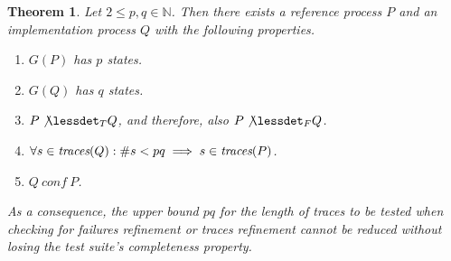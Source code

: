 \documentclass[3p,times]{elsarticle}
\newcommand{\trc}{\text{\it traces}}
\newtheorem{theorem}{Theorem}
\begin{document}
\begin{theorem}\label{th:maxtracelen}
Let $2\le p,q \in\mathbb{N}$. Then there exists a reference process $P$ and an
implementation process $Q$ with the following properties.
\begin{enumerate}
\item $G(P)$ has $p$ states.
\item $G(Q)$ has $q$ states.
\item $P\not\lessdet_T Q$, and therefore, also $P\not\lessdet_F Q$.
\item $\forall s\in\trc(Q): \#s < pq\implies s\in\trc(P)$.
\item $Q\ conf\ P$.
\end{enumerate}
As a consequence, the upper bound $pq$ for the length of traces to be tested
when checking for failures refinement or traces refinement cannot be reduced
without losing the test suite's completeness property.
\end{theorem}
\end{document}
